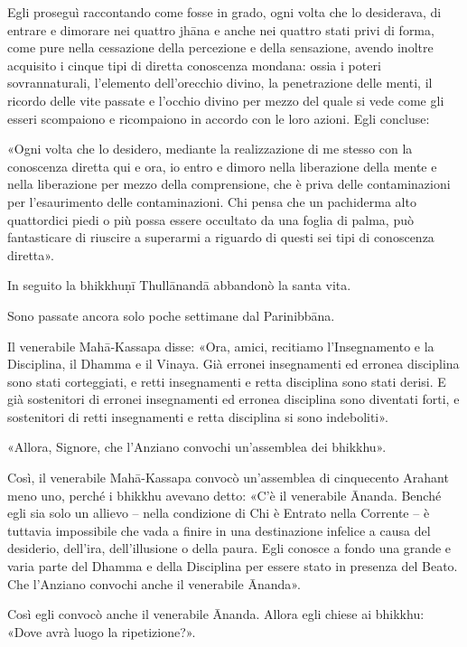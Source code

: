  Egli proseguì raccontando come fosse in grado, ogni
volta che lo desiderava, di entrare e dimorare nei quattro jhāna e anche nei
quattro stati privi di forma, come pure nella cessazione della percezione e
della sensazione, avendo inoltre acquisito i cinque tipi di diretta conoscenza
mondana: ossia i poteri sovrannaturali, l’elemento dell’orecchio divino, la
penetrazione delle menti, il ricordo delle vite passate e l’occhio divino per
mezzo del quale si vede come gli esseri scompaiono e ricompaiono in accordo con
le loro azioni. Egli concluse:

 «Ogni volta che lo desidero, mediante la realizzazione di me
stesso con la conoscenza diretta qui e ora, io entro e dimoro nella liberazione
della mente e nella liberazione per mezzo della comprensione, che è priva delle
contaminazioni per l’esaurimento delle contaminazioni. Chi pensa che un
pachiderma alto quattordici piedi o più possa essere occultato da una foglia di
palma, può fantasticare di riuscire a superarmi a riguardo di questi sei tipi di
conoscenza diretta».

In seguito la bhikkhuṇī Thullānandā abbandonò la santa vita.


 Sono passate ancora solo poche settimane dal
Parinibbāna.

 Il venerabile Mahā-Kassapa disse: «Ora, amici, recitiamo
l’Insegnamento e la Disciplina, il Dhamma e il Vinaya. Già erronei insegnamenti
ed erronea disciplina sono stati corteggiati, e retti insegnamenti e retta
disciplina sono stati derisi. E già sostenitori di erronei insegnamenti ed
erronea disciplina sono diventati forti, e sostenitori di retti insegnamenti e
retta disciplina si sono indeboliti».

«Allora, Signore, che l’Anziano convochi un’assemblea dei bhikkhu».

Così, il venerabile Mahā-Kassapa convocò un’assemblea di cinquecento Arahant
meno uno, perché i bhikkhu avevano detto: «C’è il venerabile Ānanda. Benché egli
sia solo un allievo – nella condizione di Chi è Entrato nella Corrente – è
tuttavia impossibile che vada a finire in una destinazione infelice a causa del
desiderio, dell’ira, dell’illusione o della paura. Egli conosce a fondo una
grande e varia parte del Dhamma e della Disciplina per essere stato in presenza
del Beato. Che l’Anziano convochi anche il venerabile Ānanda».

Così egli convocò anche il venerabile Ānanda. Allora egli chiese ai bhikkhu:
«Dove avrà luogo la ripetizione?».

